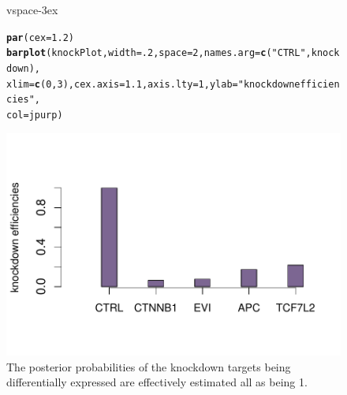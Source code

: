 \documentclass[a4paper]{article}
\makeatletter
\def\maxwidth{ %
  \ifdim\Gin@nat@width>\linewidth
    \linewidth
  \else
    \Gin@nat@width
  \fi
}
\newcommand{\hlnum}[1]{\textcolor[rgb]{0.686,0.059,0.569}{#1}}%
\newcommand{\hlstr}[1]{\textcolor[rgb]{0.192,0.494,0.8}{#1}}%
\newcommand{\hlstd}[1]{\textcolor[rgb]{0.345,0.345,0.345}{#1}}%
\newcommand{\hlkwc}[1]{\textcolor[rgb]{0.333,0.667,0.333}{#1}}%
\newcommand{\hlkwd}[1]{\textcolor[rgb]{0.737,0.353,0.396}{\textbf{#1}}}%
\newenvironment{kframe}{%
 \def\at@end@of@kframe{}%
 \ifinner\ifhmode%
  \def\at@end@of@kframe{\end{minipage}}%
  \begin{minipage}{\columnwidth}%
 \fi\fi%
 \def\FrameCommand##1{\hskip\@totalleftmargin \hskip-\fboxsep
 \colorbox{shadecolor}{##1}\hskip-\fboxsep
     \hskip-\linewidth \hskip-\@totalleftmargin \hskip\columnwidth}%
 \MakeFramed {\advance\hsize-\width
   \@totalleftmargin\z@ \linewidth\hsize
   \@setminipage}}%
 {\par\unskip\endMakeFramed%
 \at@end@of@kframe}
\newenvironment{knitrout}{}{} %
\makeatother
\begin{document}
\begin{figure}[htbp]
\begin{center}
vspace{-3ex}
\begin{knitrout}
\color{fgcolor}\begin{kframe}
\begin{alltt}
\hlkwd{par}\hlstd{(}\hlkwc{cex}\hlstd{=}\hlnum{1.2}\hlstd{)}
\hlkwd{barplot}\hlstd{(knockPlot,} \hlkwc{width}\hlstd{=}\hlnum{.2}\hlstd{,} \hlkwc{space}\hlstd{=}\hlnum{2}\hlstd{,} \hlkwc{names.arg}\hlstd{=}\hlkwd{c}\hlstd{(}\hlstr{"CTRL"}\hlstd{,knockdown),}
        \hlkwc{xlim}\hlstd{=}\hlkwd{c}\hlstd{(}\hlnum{0}\hlstd{,}\hlnum{3}\hlstd{),} \hlkwc{cex.axis}\hlstd{=}\hlnum{1.1}\hlstd{,} \hlkwc{axis.lty}\hlstd{=}\hlnum{1}\hlstd{,} \hlkwc{ylab}\hlstd{=}\hlstr{"knockdown efficiencies"}\hlstd{,}
        \hlkwc{col}\hlstd{=jpurp)}
\end{alltt}
\end{kframe}
\includegraphics[width=\maxwidth]{figure/Efficiency_barplot} 

\end{knitrout}
\caption{The posterior probabilities of the knockdown targets being differentially expressed are effectively estimated all as being 1.}
\end{center}
\end{figure}
\end{document}
